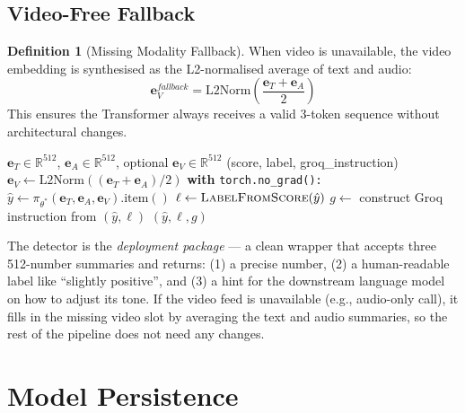 \documentclass[12pt,a4paper]{article}
\theoremstyle{definition}
\newtheorem{definition}[theorem]{Definition}
\begin{document}
\subsection{Video-Free Fallback}

\begin{definition}[Missing Modality Fallback]
When video is unavailable, the video embedding is synthesised as the L2-normalised average of text and audio:
$$\mathbf{e}_V^{fallback} = \text{L2Norm}\!\left(\frac{\mathbf{e}_T + \mathbf{e}_A}{2}\right)$$
This ensures the Transformer always receives a valid 3-token sequence without architectural changes.
\end{definition}

\begin{algorithm}[H]
\caption{\textsc{MultimodalFusionDetector.predict} — Inference}
\label{alg:inference}
\begin{algorithmic}[1]
\Require $\mathbf{e}_T \in \mathbb{R}^{512}$, $\mathbf{e}_A \in \mathbb{R}^{512}$, optional $\mathbf{e}_V \in \mathbb{R}^{512}$
\Ensure (score, label, groq\_instruction)
  \State $\mathbf{e}_V \gets \text{L2Norm}((\mathbf{e}_T + \mathbf{e}_A)/2)$ 
\EndIf
\State \textbf{with} \texttt{torch.no\_grad():}
\State \quad $\hat{y} \gets \pi_{\theta^*}(\mathbf{e}_T, \mathbf{e}_A, \mathbf{e}_V).\text{item}()$
\State $\ell \gets \textsc{LabelFromScore}(\hat{y})$
\State $g \gets$ construct Groq instruction from $(\hat{y}, \ell)$
\State \Return $(\hat{y}, \ell, g)$
\end{algorithmic}
\end{algorithm}

\begin{laymanbox}
The detector is the \emph{deployment package} — a clean wrapper that accepts three 512-number summaries and returns: (1) a precise number, (2) a human-readable label like ``slightly positive'', and (3) a hint for the downstream language model on how to adjust its tone. If the video feed is unavailable (e.g., audio-only call), it fills in the missing video slot by averaging the text and audio summaries, so the rest of the pipeline does not need any changes.
\end{laymanbox}

\section{Model Persistence}
\end{document}
